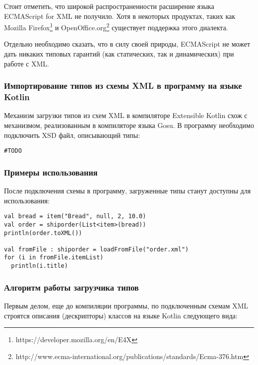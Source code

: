 Стоит отметить, что широкой распространенности расширение языка ECMAScript for XML не получило.
Хотя в некоторых продуктах, таких как Mozilla Firefox\footnote{https://developer.mozilla.org/en/E4X} и
OpenOffice.org\footnote{http://www.ecma-international.org/publications/standards/Ecma-376.htm} существует поддержка этого диалекта.

Отдельно необходимо сказать, что в силу своей природы, ECMAScript не может дать никаких типовых гарантий (как статических, так и динамических) при работе с XML.

\subsubsection{Импортирование типов из схемы XML в программу на языке Kotlin}
Механизм загрузки типов из схем XML в компиляторе Extensible Kotlin схож с механизмом, реализованным в компиляторе языка Gosu.
В программу необходимо подключить XSD файл, описывающий типы:
\begin{code}\begin{lstlisting}[caption={Подключение XML схемы в программу на языке Kotlin.}, label={xsd-type-loading-extension-point}]
#TODO
\end{lstlisting}\end{code}

\subsubsection{Примеры использования}
После подключения схемы в программу, загруженные типы станут доступны для использования: \td

\begin{code}\begin{lstlisting}[caption={Пример использования типов, загруженных из XML схемы в языке Kotlin.}, label=kotlin-simple-xml-example]
val bread = item("Bread", null, 2, 10.0)
val order = shiporder(List<item>(bread))
println(order.toXML())

val fromFile : shiporder = loadFromFile("order.xml")
for (i in fromFile.itemList)
  println(i.title)
\end{lstlisting}\end{code}

\subsubsection{Алгоритм работы загрузчика типов}

Первым делом, еще до компиляции программы, по подключенным схемам XML строятся описания (дескрипторы) классов на языке Kotlin следующего вида:

